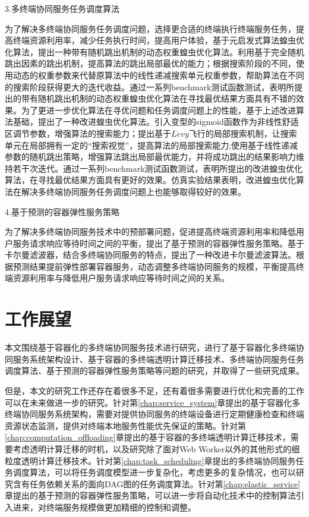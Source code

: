 3.多终端协同服务任务调度算法 

为了解决多终端协同服务任务调度问题，选择更合适的终端执行终端服务任务，提高终端资源利用率，减少任务执行时间，提高用户体验，基于元启发式算法蝗虫优化算法，提出一种带有随机跳出机制的动态权重蝗虫优化算法。利用基于完全随机跳出因素的跳出机制，提高算法的跳出局部最优的能力；根据搜索阶段的不同，使用动态的权重参数来代替原算法中的线性递减搜索单元权重参数，帮助算法在不同的搜索阶段获得更大的迭代收益。通过一系列benchmark测试函数测试，表明所提出的带有随机跳出机制的动态权重蝗虫优化算法在寻找最优结果方面具有不错的效果。为了更进一步优化算法在寻优问题和任务调度问题上的性能，基于上述改进算法基础，提出了一种改进蝗虫优化算法。引入变型的sigmoid函数作为非线性舒适区调节参数，增强算法的搜索能力；提出基于$L\acute{e}vy$飞行的局部搜索机制，让搜索单元在局部拥有一定的“搜索视觉”，提高算法的局部搜索能力;使用基于线性递减参数的随机跳出策略，增强算法跳出局部最优能力，并将成功跳出的结果影响力维持若干次迭代。通过一系列benchmark测试函数测试，表明所提出的改进蝗虫优化算法，在寻找最优结果方面具有更好的效果。仿真实验结果表明，改进蝗虫优化算法在解决多终端协同服务任务调度问题上也能够取得较好的效果。

4.基于预测的容器弹性服务策略

为了解决多终端协同服务技术中的预部署问题，促进提高终端资源利用率和降低用户服务请求响应等待时间之间的平衡，提出了基于预测的容器弹性服务策略。基于卡尔曼滤波器，结合多终端协同服务的特点，提出了一种改进卡尔曼滤波算法。根据预测结果提前弹性部署容器服务，动态调整多终端协同服务的规模，平衡提高终端资源利用率与降低用户服务请求响应等待时间之间的关系。

\section{工作展望}

本文围绕基于容器化的多终端协同服务技术进行研究，进行了基于容器化多终端协同服务系统架构设计、基于容器的多终端透明计算迁移技术、多终端协同服务任务调度算法、基于预测的容器弹性服务策略等问题的研究，并取得了一些研究成果。

但是，本文的研究工作还存在着很多不足，还有着很多需要进行优化和完善的工作可以在未来做进一步的研究。针对第\ref{chap:service_system}章提出的基于容器化多终端协同服务系统架构，需要对提供协同服务的终端设备进行定期健康检查和终端资源状态监测，提供对终端本地服务性能优先保证的策略。针对第\ref{chap:computation_offloading}章提出的基于容器的多终端透明计算迁移技术，需要考虑透明计算迁移的时机，以及研究除了面对Web Worker以外的其他形式的细粒度透明计算迁移技术。针对第\ref{chap:task_scheduling}章提出的多终端协同服务任务调度算法，可以将任务调度模型进一步复杂化，考虑更多的复杂情况，也可以研究含有任务依赖关系的面向DAG图的任务调度算法。针对第\ref{chap:elastic_service}章提出的基于预测的容器弹性服务策略，可以进一步将自动化技术中的控制算法引入进来，对终端服务规模做更加精细的控制和调整。
